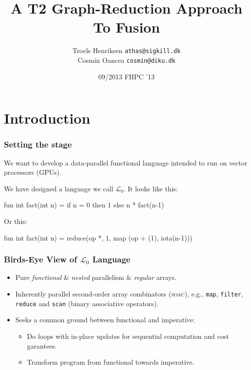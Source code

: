 \documentclass{beamer}
\title{A T2 Graph-Reduction Approach To Fusion}
\author[T.Henriksen,C.Oancea]{Troels Henriksen {\tt athas@sigkill.dk}\\Cosmin Oancea {\tt cosmin@diku.dk}}
\institute{Department of Computer Science (DIKU)\\University of Copenhagen}
\date[09/23]{09/2013 \textsc{FHPC} '13}
\newcommand{\LO}{$\mathcal{L}_0$}
\begin{document}
\titleslide

\begin{frame}[fragile]
  \tableofcontents
\end{frame}



\section{Introduction}

\begin{frame}[fragile,t]
  \frametitle{Setting the stage}

  We want to develop a data-parallel functional language intended to
  run on vector processors (GPUs).

  \pause

  We have designed a language we call \LO{}.  It looks like this:

  \begin{colorcode}
    fun int fact(int n) =
      if n = 0 then 1 else n * fact(n-1)
  \end{colorcode}

\pause

  Or this:

  \begin{colorcode}
    fun int fact(int n) =
      reduce(op *, 1, map (op + (1), iota(n-1)))
  \end{colorcode}
\end{frame}

\begin{frame}
\frametitle{Birds-Eye View of \LO{} Language}

\begin{itemize}
\item Pure {\em functional} \& {\em nested} parallelism \& {\em regular} arrays.\bigskip
\item Inherently parallel second-order array combinators (\textsc{soac}),
  e.g., {\tt map}, {\tt filter}, {\tt reduce} and {\tt scan} (binary associative operators).\bigskip
\item Seeks a common ground between functional and imperative:\bigskip
\begin{itemize}
\item Do loops with in-place updates for sequential computation and cost garantees.\bigskip
\item Transform program from functional towards imperative.
\end{itemize}
\end{itemize}

\end{frame}
\end{document}
